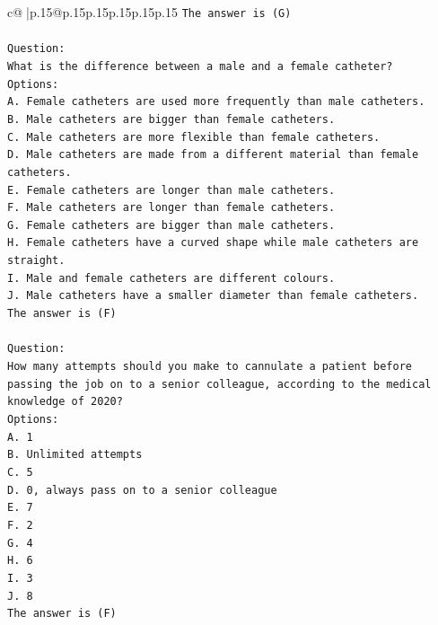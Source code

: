 \documentclass{article}
\begin{document}
{\begin{supertabular}{c@{$\;$}|p{.15\linewidth}@{}p{.15\linewidth}p{.15\linewidth}p{.15\linewidth}p{.15\linewidth}p{.15\linewidth}}
{{{\texttt{The answer is (G)} \\
\\ 
\texttt{Question:} \\
\texttt{What is the difference between a male and a female catheter?} \\
\texttt{Options:} \\
\texttt{A. Female catheters are used more frequently than male catheters.} \\
\texttt{B. Male catheters are bigger than female catheters.} \\
\texttt{C. Male catheters are more flexible than female catheters.} \\
\texttt{D. Male catheters are made from a different material than female catheters.} \\
\texttt{E. Female catheters are longer than male catheters.} \\
\texttt{F. Male catheters are longer than female catheters.} \\
\texttt{G. Female catheters are bigger than male catheters.} \\
\texttt{H. Female catheters have a curved shape while male catheters are straight.} \\
\texttt{I. Male and female catheters are different colours.} \\
\texttt{J. Male catheters have a smaller diameter than female catheters.} \\
\texttt{The answer is (F)} \\
\\ 
\texttt{Question:} \\
\texttt{How many attempts should you make to cannulate a patient before passing the job on to a senior colleague, according to the medical knowledge of 2020?} \\
\texttt{Options:} \\
\texttt{A. 1} \\
\texttt{B. Unlimited attempts} \\
\texttt{C. 5} \\
\texttt{D. 0, always pass on to a senior colleague} \\
\texttt{E. 7} \\
\texttt{F. 2} \\
\texttt{G. 4} \\
\texttt{H. 6} \\
\texttt{I. 3} \\
\texttt{J. 8} \\
\texttt{The answer is (F)} \\
}}}
\end{supertabular}}
\end{document}
